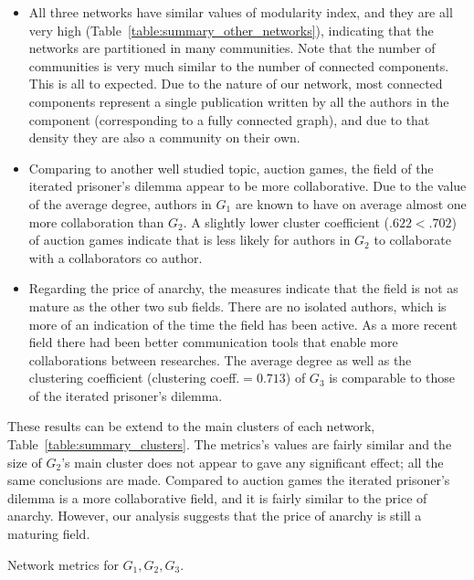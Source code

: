 \documentclass{article}
\theoremstyle{definition}
\begin{document}
\begin{itemize}
    \item All three networks have similar values of modularity index, and they are
    all very high (Table~\ref{table:summary_other_networks}), indicating that the
    networks are partitioned in many communities.
    Note that the number of
    communities is very much similar to the number of connected components.
    This is all to expected. Due to the nature of our network, most connected
    components represent a single publication written by all the authors in the
    component (corresponding to a fully connected graph), and due to that density
    they are also a community on their own.
    \item Comparing to another well studied topic, auction games, the field of the
    iterated prisoner's dilemma appear to be more collaborative. Due to the
    value of the average degree, authors in \(G_1\) are known to have on average almost
    one more collaboration than \(G_2\). A slightly lower cluster coefficient ($ .622 < .702$)
    of auction games indicate that is less likely for authors in \(G_2\) to collaborate
    with a collaborators co author.
    \item Regarding the price of anarchy, the measures indicate that the field
    is not as mature as the other two sub fields. There are no isolated authors,
    which is more of an indication of the time the field has been active. As a
    more recent field there had been better communication tools that enable more
    collaborations between researches. The average degree as well as the clustering
    coefficient (clustering coeff.$=0.713$) of \(G_3\) is comparable to those
    of the iterated prisoner's dilemma.
\end{itemize}

These results can be extend to the main clusters of each network, Table~\ref{table:summary_clusters}.
The metrics's values are fairly similar and the size of \(G_2\)'s main cluster
does not appear to gave any significant effect; all the same conclusions are made.
Compared to auction games the iterated prisoner's
dilemma is a more collaborative field, and it is fairly similar to the price of
anarchy. However, our analysis suggests that the price of anarchy is still a
maturing field.

\begin{table}[!hbtp]
    \centering
    \resizebox{\textwidth}{!}{
    }
    \caption{Network metrics for \(G_1, G_2, G_3\).}\label{table:summary_clusters}
\end{table}
\end{document}
